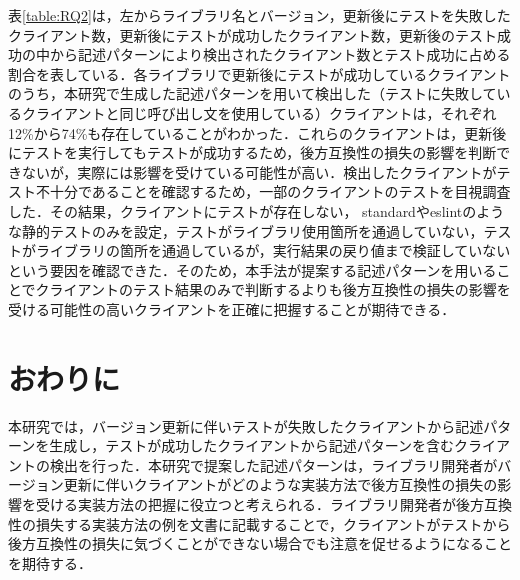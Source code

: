 \documentclass[twocolumn]{jarticle} %
\begin{document}
表\ref{table:RQ2}は，左からライブラリ名とバージョン，更新後にテストを失敗したクライアント数，更新後にテストが成功したクライアント数，更新後のテスト成功の中から記述パターンにより検出されたクライアント数とテスト成功に占める割合を表している．各ライブラリで更新後にテストが成功しているクライアントのうち，本研究で生成した記述パターンを用いて検出した（テストに失敗しているクライアントと同じ呼び出し文を使用している）クライアントは，それぞれ12\%から74\%も存在していることがわかった．これらのクライアントは，更新後にテストを実行してもテストが成功するため，後方互換性の損失の影響を判断できないが，実際には影響を受けている可能性が高い．検出したクライアントがテスト不十分であることを確認するため，一部のクライアントのテストを目視調査した．その結果，クライアントにテストが存在しない， standardやeslintのような静的テストのみを設定，テストがライブラリ使用箇所を通過していない，テストがライブラリの箇所を通過しているが，実行結果の戻り値まで検証していないという要因を確認できた．そのため，本手法が提案する記述パターンを用いることでクライアントのテスト結果のみで判断するよりも後方互換性の損失の影響を受ける可能性の高いクライアントを正確に把握することが期待できる．

\section{おわりに}
本研究では，バージョン更新に伴いテストが失敗したクライアントから記述パターンを生成し，テストが成功したクライアントから記述パターンを含むクライアントの検出を行った．本研究で提案した記述パターンは，ライブラリ開発者がバージョン更新に伴いクライアントがどのような実装方法で後方互換性の損失の影響を受ける実装方法の把握に役立つと考えられる．ライブラリ開発者が後方互換性の損失する実装方法の例を文書に記載することで，クライアントがテストから後方互換性の損失に気づくことができない場合でも注意を促せるようになることを期待する．









\end{document}
